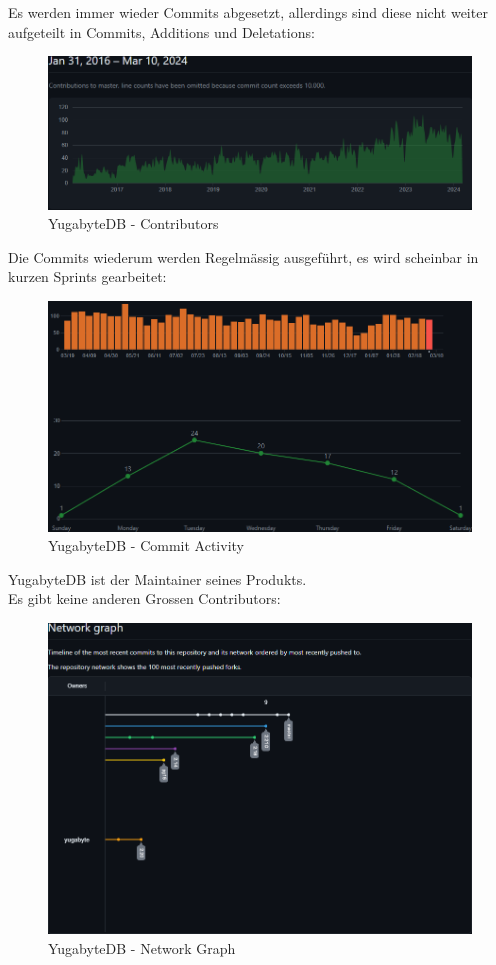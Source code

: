 \begin{flushleft}
    Es werden immer wieder Commits abgesetzt, allerdings sind diese nicht weiter aufgeteilt in Commits, Additions und Deletations:
    \begin{figure}[H]
        \centering
        \includegraphics[width=0.75\linewidth]{source/implementation/evaluation/postgresql_ha_solutions/insights/yugabytedb/contributors_to_yugabyte_yugabyte-db}
        \caption{YugabyteDB - Contributors}
        \label{fig:contributors_to_yugabyte_yugabyte-db}
    \end{figure}

    Die Commits wiederum werden Regelmässig ausgeführt, es wird scheinbar in kurzen Sprints gearbeitet:
    \begin{figure}[H]
        \centering
        \includegraphics[width=0.75\linewidth]{source/implementation/evaluation/postgresql_ha_solutions/insights/yugabytedb/commit_activity_yugabyte_yugabyte-db}
        \caption{YugabyteDB - Commit Activity}
        \label{fig:commit_activity_yugabyte_yugabyte-db}
    \end{figure}

    YugabyteDB ist der Maintainer seines Produkts.\\
    Es gibt keine anderen Grossen Contributors:
     \begin{figure}[H]
        \centering
        \includegraphics[width=0.75\linewidth]{source/implementation/evaluation/postgresql_ha_solutions/insights/yugabytedb/network_graph_yugabyte_yugabyte-db}
        \caption{YugabyteDB - Network Graph}
        \label{fig:network_graph_yugabyte_yugabyte-db}
    \end{figure}
\end{flushleft}
